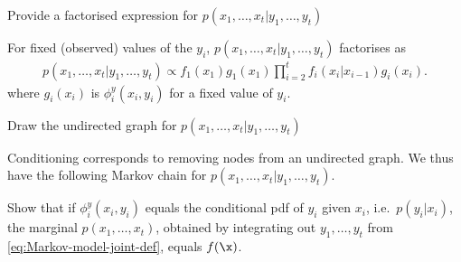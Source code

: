 \begin{exenumerate}

\item Provide a factorised expression for $ p(x_1, \ldots, x_t | y_1, \ldots, y_t)$

  \begin{solution}
    For fixed (observed) values of the $y_i$, $p(x_1, \ldots, x_t |
    y_1, \ldots, y_t)$ factorises as
    \begin{align}
      p(x_1, \ldots, x_t | y_1, \ldots, y_t) \propto f_1(x_1) g_1(x_1)
      \prod_{i=2}^t f_i(x_i|x_{i-1}) g_i(x_i).
    \end{align}
    where $g_i(x_i)$ is $\phi^y_i(x_i,y_i)$ for a fixed value of $y_i$.
  \end{solution}

\item Draw the undirected graph for $p(x_1, \ldots, x_t | y_1, \ldots, y_t)$
  \begin{solution}
    Conditioning corresponds to removing nodes from an undirected
    graph. We thus have the following Markov chain for $p(x_1, \ldots,
    x_t | y_1, \ldots, y_t)$.

\begin{center}
\end{center}

 \end{solution}

\item Show that if $\phi_i^y(x_i, y_i)$ equals the conditional pdf of
  $y_i$ given $x_i$, i.e.\ $p(y_i|x_i)$, the marginal $p(x_1, \ldots, x_t)$,
  obtained by integrating out $y_1, \ldots, y_t$ from
  \eqref{eq:Markov-model-joint-def}, equals $f(\x)$.


\end{exenumerate}
